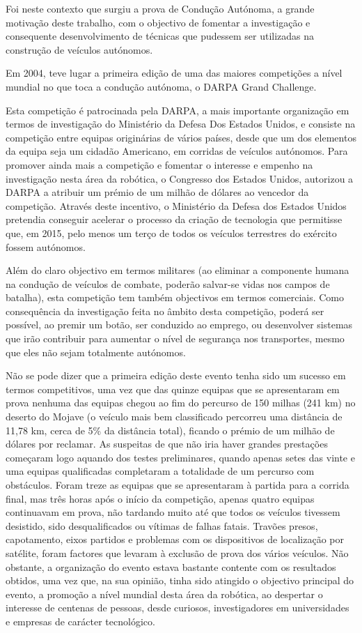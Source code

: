 \documentclass[a4paper,10pt]{texRel}
\begin{document}
Foi neste contexto que surgiu a prova de Condução Autónoma, a grande motivação deste trabalho, com o objectivo de fomentar a investigação e consequente desenvolvimento de técnicas que pudessem ser utilizadas na construção de veículos autónomos.

Em 2004, teve lugar a primeira edição de uma das maiores competições a nível mundial no que toca a condução autónoma, o DARPA Grand Challenge. 

Esta competição é patrocinada pela DARPA, a mais importante organização em termos de investigação do Ministério da Defesa Dos Estados Unidos, e consiste na competição entre equipas originárias de vários países, desde que um dos elementos da equipa seja um cidadão Americano, em corridas de veículos autónomos. Para promover ainda mais a competição e fomentar o interesse e empenho na investigação nesta área da robótica, o Congresso dos Estados Unidos, autorizou a DARPA a atribuir um prémio de um milhão de dólares ao vencedor da competição. Através deste incentivo, o Ministério da Defesa dos Estados Unidos pretendia conseguir acelerar o processo da criação de tecnologia que permitisse que, em 2015, pelo menos um terço de todos os veículos terrestres do exército fossem autónomos. 

Além do claro objectivo em termos militares (ao eliminar a componente humana na condução de veículos de combate, poderão salvar-se vidas nos campos de batalha), esta competição tem também objectivos em termos comerciais. Como consequência da investigação feita no âmbito desta competição, poderá ser possível, ao premir um botão, ser conduzido ao emprego, ou desenvolver sistemas que irão contribuir para aumentar o nível de segurança nos transportes, mesmo que eles não sejam totalmente autónomos.

Não se pode dizer que a primeira edição deste evento tenha sido um sucesso em termos competitivos, uma vez que das quinze equipas que se apresentaram em prova nenhuma das equipas chegou ao fim do percurso de 150 milhas (241 km) no deserto do Mojave (o veículo mais bem classificado percorreu uma distância de 11,78 km, cerca de 5\% da distância total), ficando o prémio de um milhão de dólares por reclamar. As suspeitas de que não iria haver grandes prestações começaram logo aquando dos testes preliminares, quando apenas setes das vinte e uma equipas qualificadas completaram a totalidade de um percurso com obstáculos. Foram treze as equipas que se apresentaram à partida para a corrida final, mas três horas após o início da competição, apenas quatro equipas continuavam em prova, não tardando muito até que todos os veículos tivessem desistido, sido desqualificados ou vítimas de falhas fatais. Travões presos, capotamento, eixos partidos e problemas com os dispositivos de localização por satélite, foram factores que levaram à exclusão de prova dos vários veículos.
Não obstante, a organização do evento estava bastante contente com os resultados obtidos, uma vez que, na sua opinião, tinha sido atingido o objectivo principal do evento, a promoção a nível mundial desta área da robótica, ao despertar o interesse de centenas de pessoas, desde curiosos, investigadores em universidades e empresas de carácter tecnológico.
\end{document}
